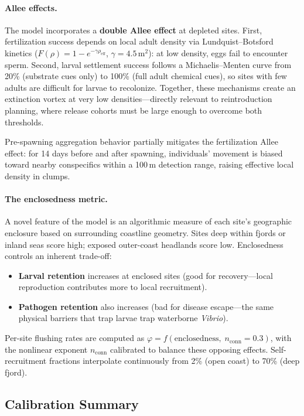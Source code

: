 \paragraph{Allee effects.}
The model incorporates a \textbf{double Allee effect} at depleted sites.
First, fertilization success depends on local adult density via
Lundquist--Botsford kinetics ($F(\rho) = 1 - e^{-\gamma \rho_\mathrm{eff}}$,
$\gamma = 4.5$\,m$^2$): at low density, eggs fail to encounter sperm.
Second, larval settlement success follows a Michaelis--Menten curve from
20\% (substrate cues only) to 100\% (full adult chemical cues), so sites
with few adults are difficult for larvae to recolonize.  Together, these
mechanisms create an extinction vortex at very low densities---directly
relevant to reintroduction planning, where release cohorts must be large
enough to overcome both thresholds.

Pre-spawning aggregation behavior partially mitigates the fertilization
Allee effect: for 14 days before and after spawning, individuals' movement
is biased toward nearby conspecifics within a 100\,m detection range,
raising effective local density in clumps.

\paragraph{The enclosedness metric.}
A novel feature of the model is an algorithmic measure of each site's
geographic enclosure based on surrounding coastline geometry.  Sites deep
within fjords or inland seas score high; exposed outer-coast headlands score
low.  Enclosedness controls an inherent trade-off:
\begin{itemize}
  \item \textbf{Larval retention} increases at enclosed sites (good for
    recovery---local reproduction contributes more to local recruitment).
  \item \textbf{Pathogen retention} also increases (bad for disease
    escape---the same physical barriers that trap larvae trap waterborne
    \textit{Vibrio}).
\end{itemize}
Per-site flushing rates are computed as $\varphi = f(\text{enclosedness},\;
n_\mathrm{conn} = 0.3)$, with the nonlinear exponent $n_\mathrm{conn}$
calibrated to balance these opposing effects.  Self-recruitment fractions
interpolate continuously from 2\% (open coast) to 70\% (deep fjord).

\subsection{Calibration Summary}
\label{sec:calibration}

